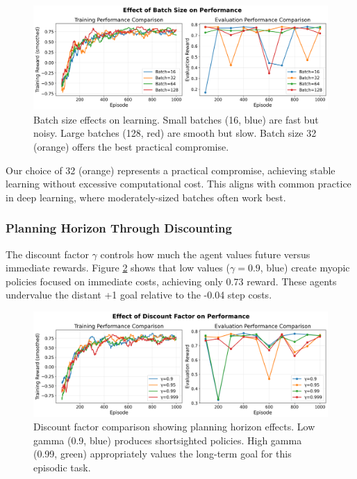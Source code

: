 \documentclass[conference]{IEEEtran}
\begin{document}
\begin{figure}[htbp]
\centerline{\includegraphics[width=\columnwidth]{images/experiment_batch_size.png}}
\caption{Batch size effects on learning. Small batches (16, blue) are fast but noisy. Large batches (128, red) are smooth but slow. Batch size 32 (orange) offers the best practical compromise.}
\label{fig:batchsize_plot}
\end{figure}

Our choice of 32 (orange) represents a practical compromise, achieving stable learning without excessive computational cost. This aligns with common practice in deep learning, where moderately-sized batches often work best.

\subsubsection{Planning Horizon Through Discounting}

The discount factor $\gamma$ controls how much the agent values future versus immediate rewards. Figure \ref{fig:gamma} shows that low values ($\gamma=0.9$, blue) create myopic policies focused on immediate costs, achieving only 0.73 reward. These agents undervalue the distant +1 goal relative to the -0.04 step costs.

\begin{figure}[htbp]
\centerline{\includegraphics[width=\columnwidth]{images/experiment_gamma.png}}
\caption{Discount factor comparison showing planning horizon effects. Low gamma (0.9, blue) produces shortsighted policies. High gamma (0.99, green) appropriately values the long-term goal for this episodic task.}
\label{fig:gamma}
\end{figure}
\end{document}
